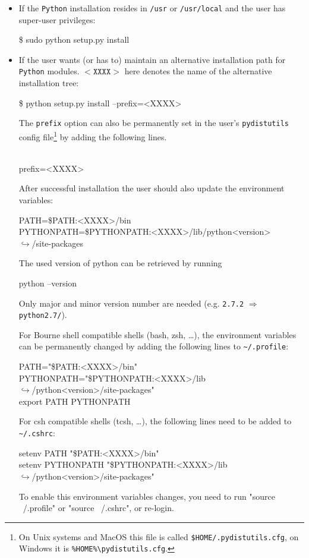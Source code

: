 \documentclass[11pt,a4paper]{refrep}
\newcommand{\python}{{\tt Python}\xspace}
\newcommand{\contl}{{\ensuremath{\hookrightarrow}}}
\begin{document}
\begin{itemize}
\item If the \python installation resides in \texttt{/usr} or
   \texttt{/usr/local}
   and the user has super-user privileges:
\begin{example}
\$ sudo python setup.py install
\end{example}

\item If the user wants (or has to) maintain an alternative installation
   path for \python modules. $\mathtt{<XXXX>}$ here denotes the name of the
   alternative installation tree:
\begin{example}
\$ python setup.py install --prefix=<XXXX>
\end{example}
   The \texttt{prefix} option can also be permanently set in the
   user's \texttt{pydistutils} config file\footnote{%
   On Unix systems and MacOS this file is called
   \texttt{\$HOME/.pydistutils.cfg}, on Windows it is
   \texttt{\%HOME\%\textbackslash{}pydistutils.cfg}.} by adding the
   following lines.
\begin{example}
[install]\\
prefix=<XXXX>
\end{example}
   After successful installation the user should also update the
   environment variables:
\begin{example}
PATH=\$PATH:<XXXX>/bin\\
PYTHONPATH=\$PYTHONPATH:<XXXX>/lib/python<version>\\
\contl/site-packages
\end{example}

   The used version of python can be retrieved by running
\begin{example}
python --version
\end{example}
   Only major and minor version number are needed (e.g. \verb!2.7.2! $\Rightarrow$ \verb!python2.7/!).

   For Bourne shell compatible shells (bash, zsh, \dots), the environment
   variables can be permanently changed by adding the following lines to \verb!~/.profile!:
\begin{example}
   PATH="\$PATH:<XXXX>/bin"\\
   PYTHONPATH="\$PYTHONPATH:<XXXX>/lib\\
   \hfil\contl/python<version>/site-packages"\\
   export PATH PYTHONPATH
\end{example}

   For csh compatible shells (tcsh, \dots), the following lines need to be added to \verb!~/.cshrc!:
\begin{example}
   setenv PATH "\$PATH:<XXXX>/bin"\\
   setenv PYTHONPATH "\$PYTHONPATH:<XXXX>/lib\\
   \hfil\contl/python<version>/site-packages"
\end{example}


To enable this environment variables changes, you need to run "source ~/.profile" or
"source ~/.cshrc", or re-login.

\end{itemize}
\end{document}
